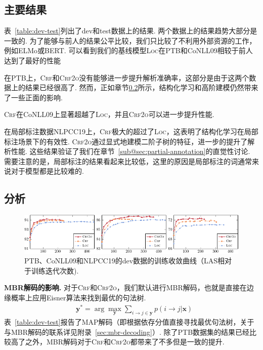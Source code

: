\subsection{主要结果}

表~\ref{table:dev-test}列出了dev和test数据上的结果.
两个数据上的结果趋势大部分是一致的.
为了能够与前人的结果公平比较，我们只比较了不利用外部资源的工作，例如ELMo\cite{peters-etal-2018-deep}或BERT\cite{devlin-etal-2019-bert}.
可以看到我们的基线模型\textsc{Loc}在PTB和CoNLL09相较于前人达到了最好的性能

在PTB上，\textsc{Crf}和\textsc{Crf2o}没有能够进一步提升解析准确率，这部分是由于这两个数据上的结果已经很高了.
然而，正如章节\ref{subsec:dep-analysis}所示，结构化学习和高阶建模仍然带来了一些正面的影响.

\textsc{Crf}在CoNLL09上显著超越了\textsc{Loc}，并且\textsc{Crf2o}可以进一步提升性能.

在局部标注数据NLPCC19上，\textsc{Crf}极大的超过了\textsc{Loc}，这表明了结构化学习在局部标注场景下的有效性.
\textsc{Crf2o}通过显式地建模二阶子树的特征，进一步的提升了解析性能.
这些结果验证了我们在章节~\ref{sub@sec:partial-annotation}的直觉性讨论.
需要注意的是，局部标注的结果看起来比较低，这里的原因是局部标注的词通常来说对于模型都是比较难的.

\subsection{分析}
\label{subsec:dep-analysis}


\begin{figure}[tb!]
    \centering
    \includegraphics[width=\textwidth]{figures/convergency.pdf}
    \caption{
        PTB、CoNLL09和NLPCC19的dev数据的训练收敛曲线（LAS相对于训练迭代次数).}
    \label{fig:convergency}
\end{figure}

\noindent\textbf{MBR解码的影响.}
对于\textsc{Crf}和\textsc{Crf2o}，我们默认进行MBR解码，也就是直接在边缘概率上应用Eisner算法\cite{smith-smith-2007-probabilistic}来找到最优的句法树.
\begin{equation}
    \begin{split}
        & {\boldsymbol{y}}^* = \arg\max_{\boldsymbol{y}} \sum_{i \rightarrow j \in \boldsymbol{y}}{p(i \rightarrow j|\boldsymbol{x})}
    \end{split}
\end{equation}
表~\ref{table:dev-test}报告了MAP解码（即根据依存分值直接寻找最优句法树，关于与MBR解码的联系详见附录~\ref{sec:mbr-decoding}）.
除了PTB数据集的结果已经比较高了之外，MBR解码对于\textsc{Crf}和\textsc{Crf2o}都带来了不多但是一致的提升.

